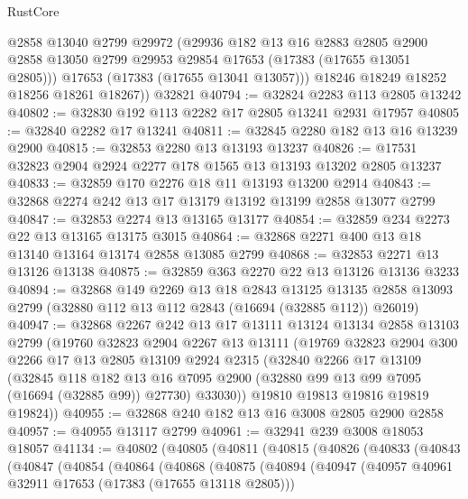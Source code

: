 \begin{lexlean}{RustCore}
\begin{coremodule}
          @2858
          @13040
          @2799
          @29972
          (@29936
            @182
            @13
            @16
            @2883
            @2805
            @2900
            @2858
            @13050
            @2799
            @29953
            @29854
            @17653
            (@17383 (@17655 @13051 @2805)))
          @17653
          (@17383 (@17655 @13041 @13057)))
        @18246
        @18249
        @18252
        @18256
        @18261
        @18267))
    @32821
@40794 := @32824 @2283 @113 @2805 @13242
@40802 := @32830 @192 @113 @2282 @17 @2805 @13241 @2931 @17957
@40805 := @32840 @2282 @17 @13241
@40811 := @32845 @2280 @182 @13 @16 @13239 @2900
@40815 := @32853 @2280 @13 @13193 @13237
@40826 := @17531 @32823 @2904 @2924 @2277 @178 @1565 @13 @13193 @13202 @2805 @13237
@40833 := @32859 @170 @2276 @18 @11 @13193 @13200 @2914
@40843 := @32868 @2274 @242 @13 @17 @13179 @13192 @13199 @2858 @13077 @2799
@40847 := @32853 @2274 @13 @13165 @13177
@40854 := @32859 @234 @2273 @22 @13 @13165 @13175 @3015
@40864 := @32868 @2271 @400 @13 @18 @13140 @13164 @13174 @2858 @13085 @2799
@40868 := @32853 @2271 @13 @13126 @13138
@40875 := @32859 @363 @2270 @22 @13 @13126 @13136 @3233
@40894 := @32868
    @149
    @2269
    @13
    @18
    @2843
    @13125
    @13135
    @2858
    @13093
    @2799
    (@32880 @112 @13 @112 @2843 (@16694 (@32885 @112)) @26019)
@40947 := @32868
    @2267
    @242
    @13
    @17
    @13111
    @13124
    @13134
    @2858
    @13103
    @2799
    (@19760
      @32823
      @2904
      @2267
      @13
      @13111
      (@19769
        @32823
        @2904
        @300
        @2266
        @17
        @13
        @2805
        @13109
        @2924
        @2315
        (@32840
          @2266
          @17
          @13109
          (@32845
            @118
            @182
            @13
            @16
            @7095
            @2900
            (@32880 @99 @13 @99 @7095 (@16694 (@32885 @99)) @27730)
            @33030))
        @19810
        @19813
        @19816
        @19819
        @19824))
@40955 := @32868 @240 @182 @13 @16 @3008 @2805 @2900 @2858
@40957 := @40955 @13117 @2799
@40961 := @32941 @239 @3008 @18053 @18057
@41134 := @40802
    (@40805
      (@40811
        (@40815
          (@40826
            (@40833
              (@40843
                (@40847
                  (@40854
                    (@40864
                      (@40868
                        (@40875
                          (@40894
                            (@40947
                              (@40957 @40961 @32911 @17653 (@17383 (@17655 @13118 @2805)))

\end{coremodule}
\end{lexlean}
